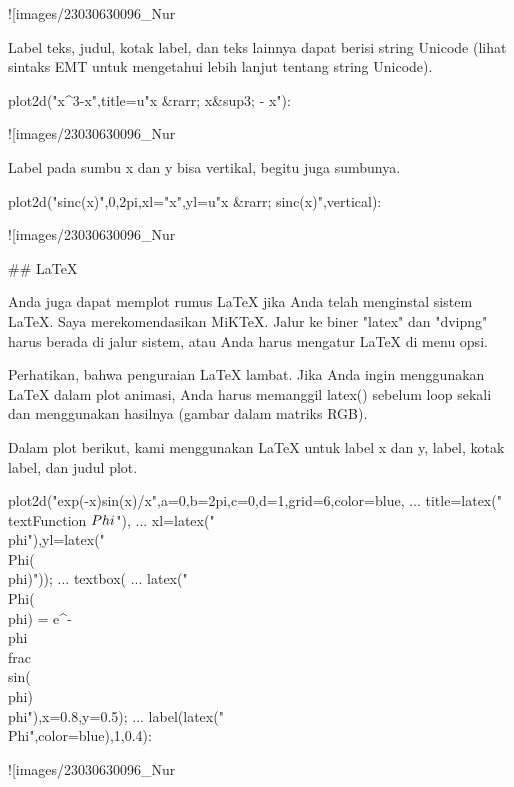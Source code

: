 \documentclass{article}
\begin{document}
![images/23030630096_Nur%

Label teks, judul, kotak label, dan teks lainnya dapat berisi string
Unicode (lihat sintaks EMT untuk mengetahui lebih lanjut tentang
string Unicode).


\>plot2d("x^3-x",title=u"x &rarr; x&sup3; - x"):


![images/23030630096_Nur%

Label pada sumbu x dan y bisa vertikal, begitu juga sumbunya.


\>plot2d("sinc(x)",0,2pi,xl="x",yl=u"x &rarr; sinc(x)",\>vertical):


![images/23030630096_Nur%

## LaTeX

Anda juga dapat memplot rumus LaTeX jika Anda telah menginstal sistem
LaTeX. Saya merekomendasikan MiKTeX. Jalur ke biner "latex" dan
"dvipng" harus berada di jalur sistem, atau Anda harus mengatur LaTeX
di menu opsi.


Perhatikan, bahwa penguraian LaTeX lambat. Jika Anda ingin menggunakan
LaTeX dalam plot animasi, Anda harus memanggil latex() sebelum loop
sekali dan menggunakan hasilnya (gambar dalam matriks RGB).


Dalam plot berikut, kami menggunakan LaTeX untuk label x dan y, label,
kotak label, dan judul plot.


\>plot2d("exp(-x)\*sin(x)/x",a=0,b=2pi,c=0,d=1,grid=6,color=blue, ...  
\>     title=latex("\\text{Function $\\Phi$}"), ...  
\>     xl=latex("\\phi"),yl=latex("\\Phi(\\phi)")); ...  
\>   textbox( ...  
\>     latex("\\Phi(\\phi) = e^{-\\phi} \\frac{\\sin(\\phi)}{\\phi}"),x=0.8,y=0.5); ...  
\>   label(latex("\\Phi",color=blue),1,0.4):


![images/23030630096_Nur%
\end{document}
